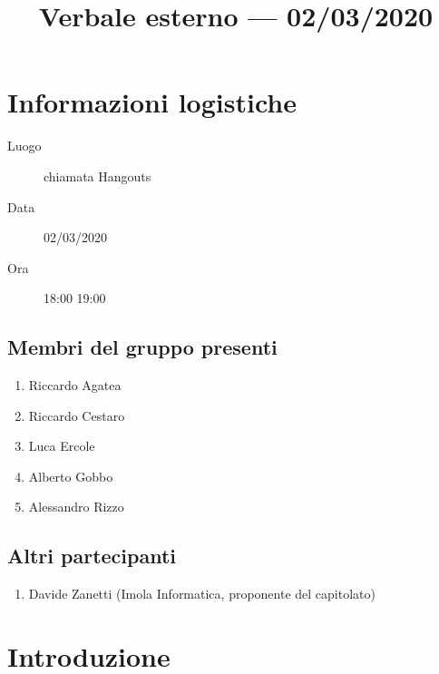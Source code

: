 \documentclass{article}
\title{Verbale esterno --- 02/03/2020}
\begin{document}


\section{Informazioni logistiche}%
\label{sec:informazioni_logistiche}

\begin{description}
  \item [Luogo] chiamata Hangouts
  \item [Data] 02/03/2020
  \item [Ora] 18:00  19:00
\end{description}

\subsection{Membri del gruppo presenti}%
\label{sub:membri_del_gruppo_presenti}

\begin{enumerate}
  \item Riccardo Agatea
  \item Riccardo Cestaro
  \item Luca Ercole
  \item Alberto Gobbo
  \item Alessandro Rizzo
\end{enumerate}


\subsection{Altri partecipanti}%
\label{sub:altri_partecipanti}

\begin{enumerate}
  \item Davide Zanetti (Imola Informatica, proponente del capitolato)
\end{enumerate}


\section{Introduzione}%
\label{sec:introduzione}
\end{document}
